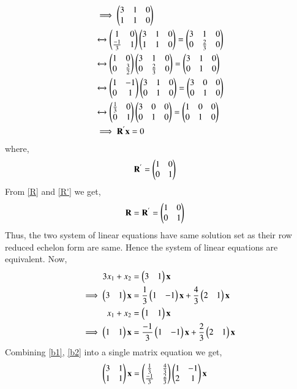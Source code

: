 \documentclass[journal,12pt,twocolumn]{IEEEtran}
\begin{document}
\begin{align}
    &\implies \begin{pmatrix}3&1&0\\1&1&0\end{pmatrix} \\
    &\xleftrightarrow{}\begin{pmatrix}1&0\\\frac{-1}{3}&1\end{pmatrix}\begin{pmatrix}3&1&0\\1&1&0\end{pmatrix} = \begin{pmatrix}3&1&0\\0&\frac{2}{3}&0\end{pmatrix} \\
    &\xleftrightarrow{}\begin{pmatrix}1&0\\0&\frac{3}{2}\end{pmatrix}\begin{pmatrix}3&1&0\\0&\frac{2}{3}&0\end{pmatrix} = \begin{pmatrix}3&1&0\\0&1&0\end{pmatrix}\\
    &\xleftrightarrow{}\begin{pmatrix}1&-1\\0&1\end{pmatrix}\begin{pmatrix}3&1&0\\0&1&0\end{pmatrix} = \begin{pmatrix}3&0&0\\0&1&0\end{pmatrix}\\
    &\xleftrightarrow{}\begin{pmatrix}\frac{1}{3}&0\\0&1\end{pmatrix}\begin{pmatrix}3&0&0\\0&1&0\end{pmatrix} = \begin{pmatrix}1&0&0\\0&1&0\end{pmatrix} \\
    &\implies\mathbf{R}^{'}\mathbf{x} = 0
\end{align}
where, 
\begin{align}
    \mathbf{R}^{'}&= \begin{pmatrix}1&0\\0&1\end{pmatrix} \label{R'}
\end{align}
From \eqref{R} and \eqref{R'} we get, 
\begin{align}
    \mathbf{R}&=\mathbf{R}^{'}=\begin{pmatrix}1&0\\0&1\end{pmatrix}
\end{align}
Thus, the two system of linear equations have same solution set as their row reduced echelon form are same. Hence the system of linear equations are equivalent. 
Now, 
\begin{align}
    3x_1 + x_2 &= \begin{pmatrix}3&1\end{pmatrix}\mathbf{x} \\
    \implies \begin{pmatrix}3&1\end{pmatrix}\mathbf{x} &= \frac{1}{3}\begin{pmatrix}1&-1\end{pmatrix}\mathbf{x} + \frac{4}{3}\begin{pmatrix}2&1\end{pmatrix}\mathbf{x} \label{b1}\\
    x_1 + x_2 &= \begin{pmatrix}1&1\end{pmatrix}\mathbf{x} \\
    \implies \begin{pmatrix}1&1\end{pmatrix}\mathbf{x} &= \frac{-1}{3}\begin{pmatrix}1&-1\end{pmatrix}\mathbf{x} + 
    \frac{2}{3}\begin{pmatrix}2&1\end{pmatrix}\mathbf{x} \label{b2}
\end{align}
Combining \eqref{b1}, \eqref{b2} into a single matrix equation we get,
\begin{align}
    \begin{pmatrix}3&1\\1&1\end{pmatrix}\mathbf{x} &= \begin{pmatrix}\frac{1}{3}&\frac{4}{3} \\ \frac{-1}{3}&\frac{2}{3}\end{pmatrix}\begin{pmatrix}1&-1\\2&1\end{pmatrix}\mathbf{x}
\end{align}
\end{document}
